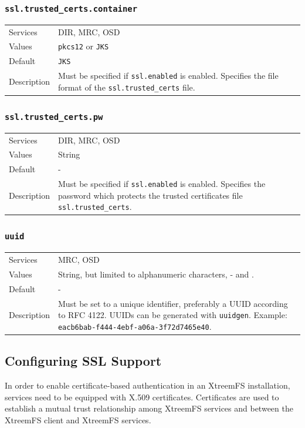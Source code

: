 \documentclass[a4paper,10pt]{book}
\begin{document}
\subsubsection{\texttt{ssl.trusted\_certs.container}}
\begin{tabular}{lp{10cm}}
 Services & DIR, MRC, OSD\\
 Values   & \texttt{pkcs12} or \texttt{JKS}\\
 Default  & \texttt{JKS}\\
 Description & Must be specified if \texttt{ssl.enabled} is enabled. Specifies the file format of the \texttt{ssl.trusted\_certs} file.
\end{tabular}

\subsubsection{\texttt{ssl.trusted\_certs.pw}}
\begin{tabular}{lp{10cm}}
 Services & DIR, MRC, OSD\\
 Values   & String\\
 Default  & -\\
 Description & Must be specified if \texttt{ssl.enabled} is enabled. Specifies the password which protects the trusted certificates file \texttt{ssl.trusted\_certs}.
\end{tabular}


\subsubsection{\texttt{uuid}}
\begin{tabular}{lp{10cm}}
 Services & MRC, OSD\\
 Values   & String, but limited to alphanumeric characters, - and . \\
 Default  & - \\
 Description & Must be set to a unique identifier, preferably a UUID according to RFC 4122. UUIDs can be generated with \texttt{uuidgen}. Example: \texttt{eacb6bab-f444-4ebf-a06a-3f72d7465e40}.
\end{tabular}




\subsection{Configuring SSL Support}

In order to enable certificate-based authentication in an XtreemFS installation, services need to be equipped with X.509 certificates. Certificates are used to establish a mutual trust relationship among XtreemFS services and between the XtreemFS client and XtreemFS services.
\end{document}
